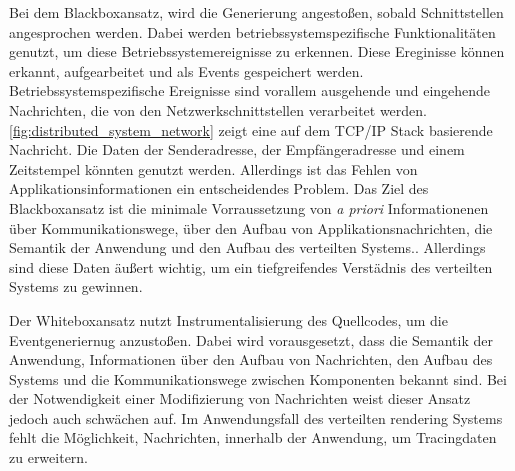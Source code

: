 Bei dem Blackboxansatz, wird die Generierung angestoßen, sobald Schnittstellen angesprochen werden. Dabei werden betriebssystemspezifische Funktionalitäten genutzt, um diese Betriebssystemereignisse zu erkennen. Diese Ereginisse können erkannt, aufgearbeitet und als Events gespeichert werden. Betriebssystemspezifische Ereignisse sind vorallem ausgehende und eingehende Nachrichten, die von den Netzwerkschnittstellen verarbeitet werden. \cref{fig:distributed_system_network} zeigt eine auf dem TCP/IP Stack basierende Nachricht. Die Daten der Senderadresse, der Empfängeradresse und einem Zeitstempel könnten genutzt werden. Allerdings ist das Fehlen von Applikationsinformationen ein entscheidendes Problem. Das Ziel des Blackboxansatz ist die minimale Vorraussetzung von \emph{a priori} Informationenen über Kommunikationswege, über den Aufbau von Applikationsnachrichten, die Semantik der Anwendung und den Aufbau des verteilten Systems.. Allerdings sind diese Daten äußert wichtig, um ein tiefgreifendes Verstädnis des verteilten Systems zu gewinnen. 

Der Whiteboxansatz nutzt Instrumentalisierung des Quellcodes, um die Eventgeneriernug anzustoßen. Dabei wird vorausgesetzt, dass die Semantik der Anwendung, Informationen über den Aufbau von Nachrichten, den Aufbau des Systems und die Kommunikationswege zwischen Komponenten bekannt sind. Bei der Notwendigkeit einer Modifizierung von Nachrichten weist dieser Ansatz jedoch auch schwächen auf. Im Anwendungsfall des verteilten rendering Systems fehlt die Möglichkeit, Nachrichten, innerhalb der Anwendung, um Tracingdaten zu erweitern.


